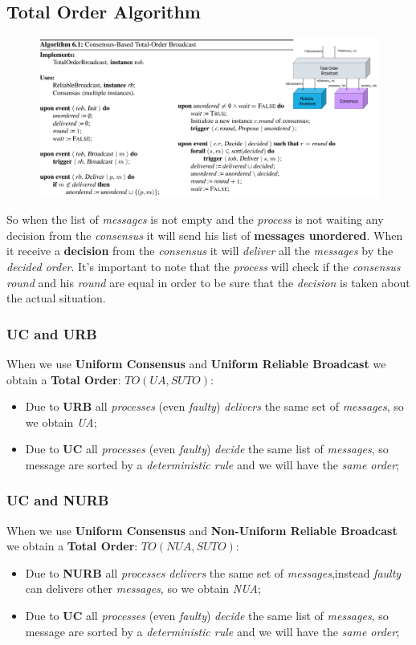 \documentclass{article}
\begin{document}
\subsection{Total Order Algorithm}
\begin{figure}[H]
  \centering
  \includegraphics[scale=0.8]{cattura59.png}
\end{figure}
So when the list of \emph{messages} is not empty and the \emph{process} is not waiting any decision from the \emph{consensus} it will send his list of \textbf{messages unordered}. When it receive a \textbf{decision} from the \emph{consensus} it will \emph{deliver} all the \emph{messages} by the \emph{decided order}. It's important to note that the \emph{process} will check if the \emph{consensus round} and his \emph{round} are equal in order to be sure that the \emph{decision} is taken about the actual situation.
\subsubsection{UC and URB}
When we use \textbf{Uniform Consensus} and \textbf{Uniform Reliable Broadcast} we obtain a \textbf{Total Order}: $TO(UA,SUTO)$:
\begin{itemize}
\item Due to \textbf{URB} all \emph{processes} (even \emph{faulty}) \emph{delivers} the same set of \emph{messages}, so we obtain \emph{UA};
\item Due to \textbf{UC} all \emph{processes} (even \emph{faulty}) \emph{decide} the same list of \emph{messages}, so message are sorted by a \emph{deterministic rule} and we will have the \emph{same order};
\end{itemize}

\subsubsection{UC and NURB}
When we use \textbf{Uniform Consensus} and \textbf{Non-Uniform Reliable Broadcast} we obtain a \textbf{Total Order}: $TO(NUA,SUTO)$:
\begin{itemize}
\item Due to \textbf{NURB} all \emph{processes} \emph{delivers} the same set of \emph{messages},instead \emph{faulty} can delivers other \emph{messages}, so we obtain \emph{NUA};
\item Due to \textbf{UC} all \emph{processes} (even \emph{faulty}) \emph{decide} the same list of \emph{messages}, so message are sorted by a \emph{deterministic rule} and we will have the \emph{same order};
\end{itemize}
\end{document}
